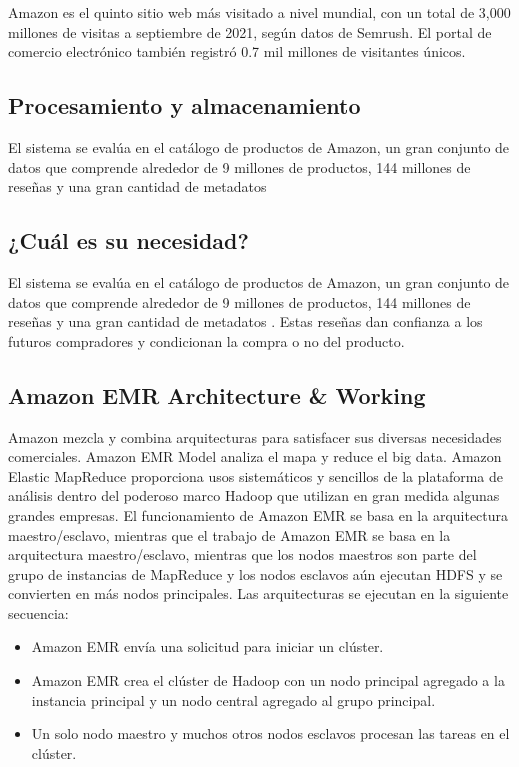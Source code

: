 Amazon es el quinto sitio web más visitado a nivel mundial, con un total de 3,000 millones de visitas a septiembre de 2021, según datos de Semrush. El portal de comercio electrónico también registró 0.7 mil millones de visitantes únicos. 

\subsection{Procesamiento y almacenamiento}
El sistema se evalúa en el catálogo de productos de Amazon, un gran conjunto de datos que comprende alrededor de 9 millones de productos, 144 millones de reseñas y una gran cantidad de metadatos 

\subsection{¿Cuál es su necesidad?}

El sistema se evalúa en el catálogo de productos de Amazon, un gran conjunto de datos que comprende alrededor de 9 millones de productos, 144 millones de reseñas y una gran cantidad de metadatos . Estas reseñas dan confianza a los futuros compradores y condicionan la compra   o no del producto.

\subsection{Amazon EMR Architecture \& Working}
Amazon mezcla y combina arquitecturas para satisfacer sus diversas necesidades comerciales. Amazon EMR Model analiza el mapa y reduce el big data. Amazon Elastic MapReduce proporciona usos sistemáticos y sencillos de la plataforma de análisis dentro del poderoso marco Hadoop que utilizan en gran medida algunas grandes empresas. El funcionamiento de Amazon EMR se basa en la arquitectura maestro/esclavo, mientras que el trabajo de Amazon EMR se basa en la arquitectura maestro/esclavo, mientras que los nodos maestros son parte del grupo de instancias de MapReduce y los nodos esclavos aún ejecutan HDFS y se convierten en más nodos principales. Las arquitecturas se ejecutan en la siguiente secuencia:
\begin{itemize}
	\item Amazon EMR envía una solicitud para iniciar un clúster.
	\item Amazon EMR crea el clúster de Hadoop con un nodo principal agregado a la instancia principal y un nodo central agregado al grupo principal.
	\item Un solo nodo maestro y muchos otros nodos esclavos procesan las tareas en el clúster.
\end{itemize}



